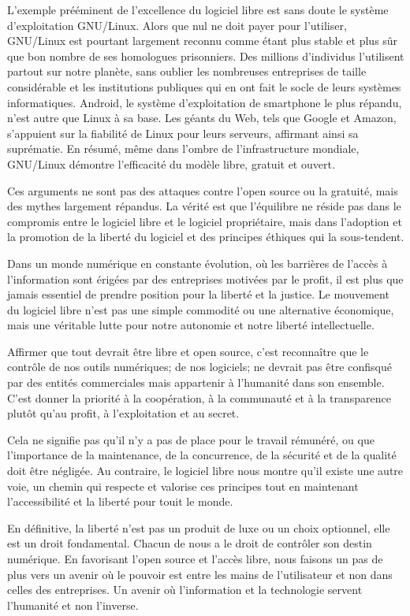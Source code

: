 L'exemple prééminent de l'excellence du logiciel libre est sans doute le système d'exploitation GNU/Linux. Alors que nul ne doit payer pour l'utiliser, GNU/Linux est pourtant largement reconnu comme étant plus stable et plus sûr que bon nombre de ses homologues prisonniers. Des millions d'individus l'utilisent partout sur notre planète, sans oublier les nombreuses entreprises de taille considérable et les institutions publiques qui en ont fait le socle de leurs systèmes informatiques. Android, le système d'exploitation de smartphone le plus répandu, n'est autre que Linux à sa base. Les géants du Web, tels que Google et Amazon, s'appuient sur la fiabilité de Linux pour leurs serveurs, affirmant ainsi sa suprématie. En résumé, même dans l'ombre de l'infrastructure mondiale, GNU/Linux démontre l'efficacité du modèle libre, gratuit et ouvert.


Ces arguments ne sont pas des attaques contre l'open source ou la gratuité, mais des mythes largement répandus. La vérité est que l'équilibre ne réside pas dans le compromis entre le logiciel libre et le logiciel propriétaire, mais dans l'adoption et la promotion de la liberté du logiciel et des principes éthiques qui la sous-tendent.

Dans un monde numérique en constante évolution, où les barrières de l'accès à l'information sont érigées par des entreprises motivées par le profit, il est plus que jamais essentiel de prendre position pour la liberté et la justice. Le mouvement du logiciel libre n'est pas une simple commodité ou une alternative économique, mais une véritable lutte pour notre autonomie et notre liberté intellectuelle.

Affirmer que tout devrait être libre et open source, c'est reconnaître que le contrôle de nos outils numériques; de nos logiciels;  ne devrait pas être confisqué par des entités commerciales mais appartenir à l'humanité dans son ensemble. C'est donner la priorité à la coopération, à la communauté et à la transparence plutôt qu'au profit, à l'exploitation et au secret.

Cela ne signifie pas qu'il n'y a pas de place pour le travail rémunéré, ou que l'importance de la maintenance, de la concurrence, de la sécurité et de la qualité doit être négligée. Au contraire, le logiciel libre nous montre qu'il existe une autre voie, un chemin qui respecte et valorise ces principes tout en maintenant l'accessibilité et la liberté pour touit le monde.

En définitive, la liberté n'est pas un produit de luxe ou un choix optionnel, elle est un droit fondamental. Chacun de nous a le droit de contrôler son destin numérique. En favorisant l'open source et l'accès libre, nous faisons un pas de plus vers un avenir où le pouvoir est entre les mains de l'utilisateur et non dans celles des entreprises. Un avenir où l'information et la technologie servent l'humanité et non l'inverse.

